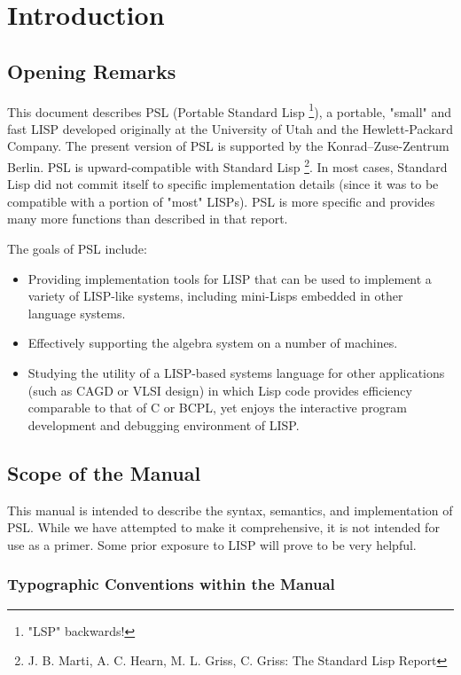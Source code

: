 

\chapter{Introduction}

\section{Opening Remarks}

 This document describes PSL (Portable Standard Lisp \footnote{
"LSP"  backwards!}),  a portable, "small" and fast LISP developed 
originally at the University  of  Utah and the Hewlett-Packard Company.
The present version of PSL is supported by the Konrad--Zuse-Zentrum Berlin. 
PSL is upward-compatible with Standard Lisp 
\footnote{J. B. Marti, A. C. Hearn, M. L. Griss, C. Griss: 
The Standard Lisp Report}.  In most cases,
Standard Lisp did not commit itself to  specific  implementation
details  (since it was to be compatible with a portion of "most"
LISPs).  PSL is more specific and provides many  more  functions
than described in that report.

The goals of PSL include:
\begin{itemize}
\item Providing implementation tools for LISP that can be used to
     implement   a   variety  of  LISP-like  systems,  including
     mini-Lisps embedded in  other  language  systems.
\item Effectively  supporting the algebra system on a
     number of machines.
\item Studying  the  utility of a LISP-based systems language for
     other applications (such as CAGD or VLSI design)  in  which
     Lisp code provides efficiency comparable to that of C or
     BCPL,  yet  enjoys  the interactive program development and
     debugging environment of LISP.
\end{itemize}

\section{Scope of the Manual}

This manual is intended to describe the syntax, semantics, and
implementation of PSL.  While  we  have  attempted  to  make  it
comprehensive,  it  is  not  intended for use as a primer.  Some
prior exposure to LISP will prove to be very helpful. 

\subsection{Typographic Conventions within the Manual}

